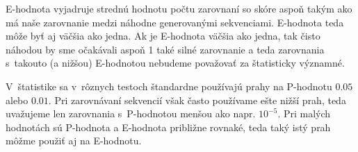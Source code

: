 E-hodnota vyjadruje strednú hodnotu počtu zarovnaní so skóre aspoň takým ako má naše zarovnanie medzi náhodne generovanými sekvenciami. E-hodnota teda môže byť aj väčšia ako jedna. Ak je E-hodnota väčšia ako jedna, tak čisto náhodou by sme očakávali aspoň 1 také silné zarovnanie a teda zarovnania s~takouto (a nižšou) E-hodnotou nebudeme považovať za štatisticky významné.

V~štatistike sa v~rôznych testoch štandardne používajú prahy na P-hodnotu $0.05$ alebo $0.01$.
Pri zarovnávaní sekvencií však často používame ešte nižší prah, teda uvažujeme len zarovnania s~P-hodnotou menšou ako napr. $10^{-5}$. Pri malých hodnotách sú P-hodnota a E-hodnota približne rovnaké, teda taký istý prah môžme použiť aj na E-hodnotu.
